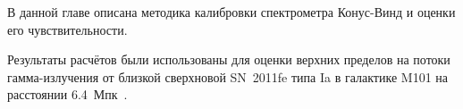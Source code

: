 В данной главе описана методика калибровки спектрометра Конус-Винд и оценки его чувствительности. 

Результаты расчётов были использованы для оценки верхних пределов на потоки гамма-излучения 
от близкой сверхновой SN~2011fe типа Ia в галактике M101 на расстоянии 6.4~Мпк~\citep{Margutti_2012ApJ}.

\clearpage